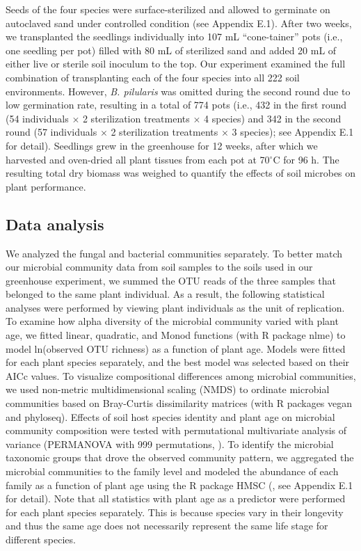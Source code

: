 Seeds of the four species were surface-sterilized and allowed to germinate on autoclaved sand under controlled condition (see Appendix E.1). After two weeks, we transplanted the seedlings individually into 107 mL ``cone-tainer'' pots (i.e., one seedling per pot) filled with 80 mL of sterilized sand and added 20 mL of either live or sterile soil inoculum to the top. 
Our experiment examined the full combination of transplanting each of the four species into all 222 soil environments. However, \textit{B. pilularis} was omitted during the second round due to low germination rate, resulting in a total of 774 pots (i.e., 432 in the first round (54 individuals $\times$ 2 sterilization treatments $\times$ 4 species) and 342 in the second round (57 individuals $\times$ 2 sterilization treatments $\times$ 3 species); see Appendix E.1 for detail).
Seedlings grew in the greenhouse for 12 weeks, after which we harvested and oven-dried all plant tissues from each pot at 70$^{\circ}$C for 96 h. The resulting total dry biomass was weighed to quantify the effects of soil microbes on plant performance.
\par



\subsection*{Data analysis}
We analyzed the fungal and bacterial communities separately. To better match our microbial community data from soil samples to the soils used in our greenhouse experiment, we summed the OTU reads of the three samples that belonged to the same plant individual. As a result, the following statistical analyses were performed by viewing plant individuals as the unit of replication. 
To examine how alpha diversity of the microbial community varied with plant age, we fitted linear, quadratic, and Monod functions (with R package nlme) to model ln(observed OTU richness) as a function of plant age. Models were fitted for each plant species separately, and the best model was selected based on their AICc values.
To visualize compositional differences among microbial communities, we used non-metric multidimensional scaling (NMDS) to ordinate microbial communities based on Bray-Curtis dissimilarity matrices (with R packages vegan and phyloseq). Effects of soil host species identity and plant age on microbial community composition were tested with permutational multivariate analysis of variance (PERMANOVA with 999 permutations, \citealp{Anderson2011}). 
To identify the microbial taxonomic groups that drove the observed community pattern, we aggregated the microbial communities to the family level and modeled the abundance of each family as a function of plant age using the R package HMSC (\citealp{Ovaskainen2017}, see Appendix E.1 for detail). 
Note that all statistics with plant age as a predictor were performed for each plant species separately. This is because species vary in their longevity and thus the same age does not necessarily represent the same life stage for different species.
\par


